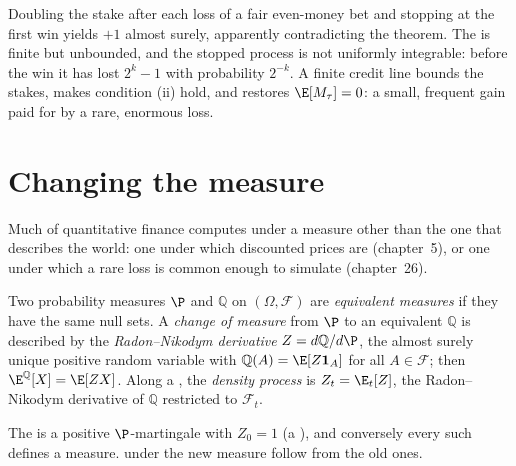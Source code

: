 \begin{remark}\label{rem:qm:probability-at-speed:doubling}
Doubling the stake after each loss of a fair even-money bet and stopping at the first win
yields $+1$ almost surely, apparently contradicting the theorem. The  is finite
but unbounded, and the stopped process is not uniformly integrable: before the win it has
lost $2^k - 1$ with probability $2^{-k}$. A finite credit line bounds the stakes, makes
condition (ii) hold, and restores $\E[M_\tau] = 0$: a small, frequent gain paid for by a rare,
enormous loss.
\end{remark}

\section{Changing the measure}\label{sec:qm:probability-at-speed:measure}

Much of quantitative finance computes under a measure other than the one that describes the
world: one under which discounted prices are  (chapter~5), or one under which a
rare loss is common enough to simulate (chapter~26).

\begin{definition}\label{def:qm:probability-at-speed:change}
Two probability measures $\P$ and $\mathbb Q$ on $(\Omega, \mathcal F)$ are
\emph{equivalent measures} if they have the same null sets. A
\emph{change of measure} from $\P$ to an equivalent $\mathbb Q$ is
described by the \emph{Radon--Nikodym derivative} $Z =
d\mathbb Q/d\P$, the almost surely unique positive random variable with $\mathbb Q(A) =
\E[Z\mathbf 1_A]$ for all $A \in \mathcal F$; then $\E^{\mathbb Q}[X] = \E[ZX]$. Along a
, the \emph{density process} is $Z_t = \E_t[Z]$, the
Radon--Nikodym derivative of $\mathbb Q$ restricted to $\mathcal F_t$.
\end{definition}

The  is a positive $\P$-martingale with $Z_0 = 1$ (a ), and
conversely every such  defines a measure.  under the new
measure follow from the old ones.

